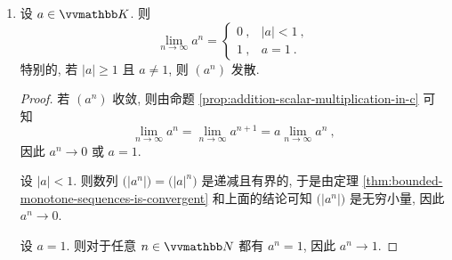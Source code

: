 \begin{example}\label{eg:some-important-limits}
    \begin{enumerate}
        \item 设 \(a \in \K\). 则
        \[
            \lim_{n \to \infty} a^n =
            \begin{cases}
                0\ , & |a| < 1\ , \\
                1\ , & a = 1\ .
            \end{cases}
        \]
        特别的, 若 \(|a| \geq 1\) 且 \(a \neq 1\), 则 \((a^n)\) 发散.
        \begin{proof}
            若 \((a^n)\) 收敛, 则由命题 \ref{prop:addition-scalar-multiplication-in-c} 可知
            \[
                \lim_{n \to \infty} a^n = \lim_{n \to \infty} a^{n + 1} = a \lim_{n \to \infty} a^n\ ,
            \]
            因此 \(a^n \to 0\) 或 \(a = 1\).

            设 \(|a| < 1\). 则数列 \(\bigl(|a^n|\bigr) = \bigl(|a|^n\bigr)\) 是递减且有界的, 于是由定理 \ref{thm:bounded-monotone-sequences-is-convergent} 和上面的结论可知 \(\bigl(|a^n|\bigr)\) 是无穷小量, 因此 \(a^n \to 0\).

            设 \(a = 1\). 则对于任意 \(n \in \N\) 都有 \(a^n = 1\), 因此 \(a^n \to 1\).


\end{proof}
\end{enumerate}
\end{example}
